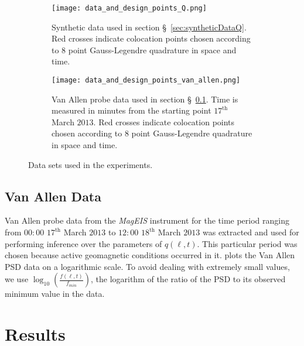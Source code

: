 \begin{figure*}[!htb]
  \centering
  \begin{subfigure}[b]{0.75\textwidth}
    \centering
    \texttt{[image: data\_and\_design\_points\_Q.png]}
    \caption{{\small 
      Synthetic data used in section \S~\ref{sec:syntheticDataQ}.
      Red crosses indicate colocation points chosen according to $8$ point Gauss-Legendre 
      quadrature in space and time. 
    }}
  \label{fig:trainingDataQ}
  \end{subfigure}
  \hfill
  \begin{subfigure}[b]{0.75\textwidth}
    \centering
    \texttt{[image: data\_and\_design\_points\_van\_allen.png]}
    \caption{{\small 
      Van Allen probe data used in section \S~\ref{sec:vanAllenData}. Time is measured in minutes 
      from the starting point $17^{\text{th}}$ March $2013$. Red crosses indicate 
      colocation points chosen according to $8$ point Gauss-Legendre quadrature in space and time.
    }}
    \label{fig:trainingDataVanAllen} 
  \end{subfigure} 
  \caption{Data sets used in the experiments.}
\end{figure*}

\subsection{Van Allen Data}\label{sec:vanAllenData}

Van Allen probe data from the \emph{MagEIS} instrument for the time period ranging from 
$00:00$ $17^{\text{th}}$ March $2013$ to $12:00$ $18^{\text{th}}$ March $2013$ was extracted and 
used for performing inference over the parameters of $q(\ell, t)$. This particular period was 
chosen because active geomagnetic conditions occurred in it.  
plots the Van Allen PSD data on a logarithmic scale. To avoid dealing with extremely small values, 
we use $\log_{10}\left( \frac{f(\ell, t)}{f_{min}} \right)$, the logarithm of the ratio of the PSD 
to its observed minimum value in the data. 

\section{Results}

